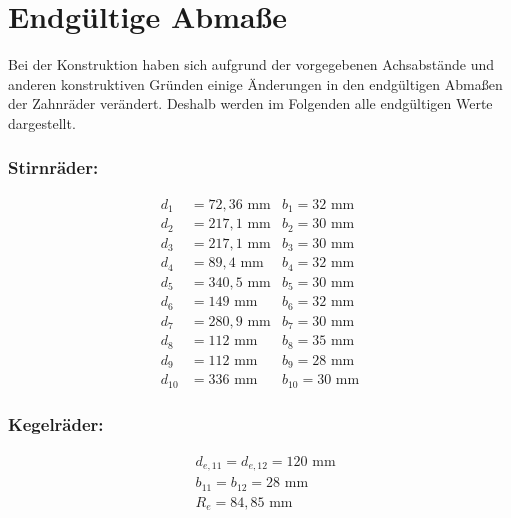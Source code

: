 \section{Endgültige Abmaße}
Bei der Konstruktion haben sich aufgrund der vorgegebenen Achsabstände und anderen konstruktiven Gründen einige Änderungen in den endgültigen Abmaßen der Zahnräder verändert. Deshalb werden im Folgenden alle endgültigen Werte dargestellt.
\subsubsection{Stirnräder:}
\begin{align*}
	d_1 &= 72,36\text{ mm} & b_1= 32\text{ mm}\\
	d_2 &= 217,1\text{ mm} & b_2= 30\text{ mm}\\
	d_3 &= 217,1\text{ mm} & b_3= 30\text{ mm}\\
	d_4 &= 89,4\text{ mm} & b_4= 32\text{ mm}\\
	d_5 &= 340,5\text{ mm} & b_5= 30\text{ mm}\\
	d_6 &= 149\text{ mm} & b_6= 32\text{ mm}\\
	d_7 &= 280,9\text{ mm} & b_7= 30\text{ mm}\\
	d_8 &= 112\text{ mm} & b_8= 35\text{ mm}\\
	d_9 &= 112\text{ mm} & b_9= 28\text{ mm}\\
	d_{10} &= 336\text{ mm} & b_{10}= 30\text{ mm}
\end{align*}
\subsubsection{Kegelräder:}
\begin{align*}
	&d_{e,11} = d_{e,12} = 120\text{ mm} \\
	&b_{11} = b_{12} = 28 \text{ mm} \\
	&R_e = 84,85 \text{ mm}
\end{align*}

